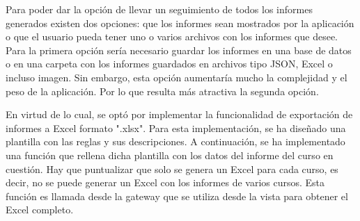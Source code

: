 Para poder dar la opción de llevar un seguimiento de todos los informes generados existen dos opciones: que los informes sean mostrados por la aplicación o que el usuario pueda tener uno o varios archivos con los informes que desee. Para la primera opción sería necesario guardar los informes en una base de datos o en una carpeta con los informes guardados en archivos tipo JSON, Excel o incluso imagen. Sin embargo, esta opción aumentaría mucho la complejidad y el peso de la aplicación. Por lo que resulta más atractiva la segunda opción.

En virtud de lo cual, se optó por implementar la funcionalidad de exportación de informes a Excel formato ".xlsx". Para esta implementación, se ha diseñado una plantilla con las reglas y sus descripciones. A continuación, se ha implementado una función que rellena dicha plantilla con los datos del informe del curso en cuestión. Hay que puntualizar que solo se genera un Excel para cada curso, es decir, no se puede generar un Excel con los informes de varios cursos. Esta función es llamada desde la gateway que se utiliza desde la vista para obtener el Excel completo. 







